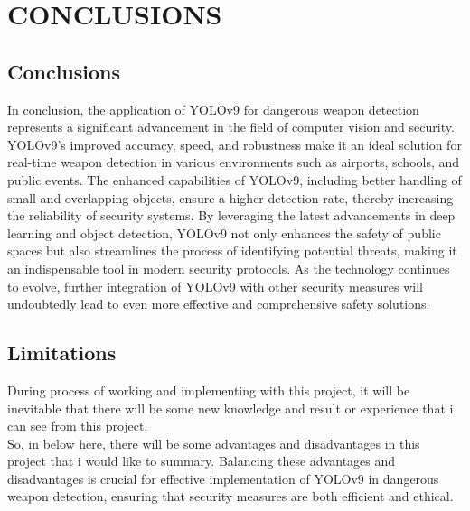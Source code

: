 \chapter{CONCLUSIONS}

\renewcommand{\headrulewidth}{0.5pt}
\renewcommand{\footrulewidth}{0.5pt}
\thispagestyle{plain}
\pagestyle{fancy}
\fancyhf{}
\raggedright
{}

\justifying

\section{Conclusions}
    In conclusion, the application of YOLOv9 for dangerous weapon detection represents a significant advancement in the field of computer vision and security. YOLOv9's improved accuracy, speed, and robustness make it an ideal solution for real-time weapon detection in various environments such as airports, schools, and public events. The enhanced capabilities of YOLOv9, including better handling of small and overlapping objects, ensure a higher detection rate, thereby increasing the reliability of security systems. By leveraging the latest advancements in deep learning and object detection, YOLOv9 not only enhances the safety of public spaces but also streamlines the process of identifying potential threats, making it an indispensable tool in modern security protocols. As the technology continues to evolve, further integration of YOLOv9 with other security measures will undoubtedly lead to even more effective and comprehensive safety solutions.
\section{Limitations}
    During process of working and implementing with this project, it will be inevitable that there will be some new knowledge and result or experience that i can see from this project. \\
    \vspace{3mm}
    So, in below here, there will be some advantages and disadvantages in this project that i would like to summary. Balancing these advantages and disadvantages is crucial for effective implementation of YOLOv9 in dangerous weapon detection, ensuring that security measures are both efficient and ethical.
